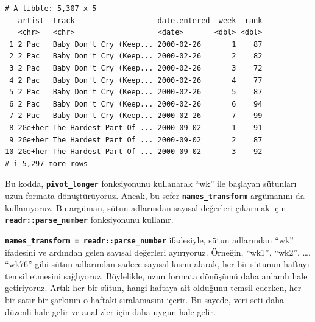 \documentclass[
  letterpaper,
  DIV=11,
  numbers=noendperiod]{scrreprt}
\begin{document}
\begin{verbatim}
# A tibble: 5,307 x 5
   artist  track                   date.entered  week  rank
   <chr>   <chr>                   <date>       <dbl> <dbl>
 1 2 Pac   Baby Don't Cry (Keep... 2000-02-26       1    87
 2 2 Pac   Baby Don't Cry (Keep... 2000-02-26       2    82
 3 2 Pac   Baby Don't Cry (Keep... 2000-02-26       3    72
 4 2 Pac   Baby Don't Cry (Keep... 2000-02-26       4    77
 5 2 Pac   Baby Don't Cry (Keep... 2000-02-26       5    87
 6 2 Pac   Baby Don't Cry (Keep... 2000-02-26       6    94
 7 2 Pac   Baby Don't Cry (Keep... 2000-02-26       7    99
 8 2Ge+her The Hardest Part Of ... 2000-09-02       1    91
 9 2Ge+her The Hardest Part Of ... 2000-09-02       2    87
10 2Ge+her The Hardest Part Of ... 2000-09-02       3    92
# i 5,297 more rows
\end{verbatim}

Bu kodda, \textbf{\texttt{pivot\_longer}} fonksiyonunu kullanarak ``wk''
ile başlayan sütunları uzun formata dönüştürüyoruz. Ancak, bu sefer
\textbf{\texttt{names\_transform}} argümanını da kullanıyoruz. Bu
argüman, sütun adlarından sayısal değerleri çıkarmak için
\textbf{\texttt{readr::parse\_number}} fonksiyonunu kullanır.

\textbf{\texttt{names\_transform\ =\ readr::parse\_number}} ifadesiyle,
sütun adlarından ``wk'' ifadesini ve ardından gelen sayısal değerleri
ayırıyoruz. Örneğin, ``wk1'', ``wk2'', \ldots, ``wk76'' gibi sütun
adlarından sadece sayısal kısmı alarak, her bir sütunun haftayı temsil
etmesini sağlıyoruz. Böylelikle, uzun formata dönüşümü daha anlamlı hale
getiriyoruz. Artık her bir sütun, hangi haftaya ait olduğunu temsil
ederken, her bir satır bir şarkının o haftaki sıralamasını içerir. Bu
sayede, veri seti daha düzenli hale gelir ve analizler için daha uygun
hale gelir.
\end{document}
